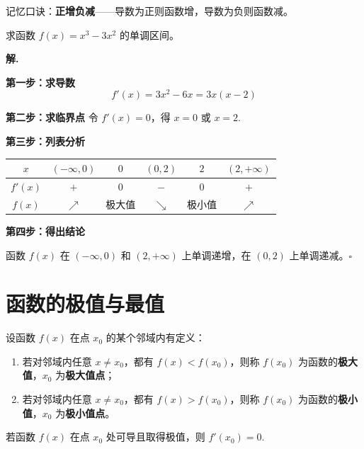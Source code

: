 \begin{note}
记忆口诀：\textbf{正增负减}——导数为正则函数增，导数为负则函数减。
\end{note}

\begin{longexample}
求函数 $f(x) = x^3 - 3x^2$ 的单调区间。
\end{longexample}

\textbf{解.} 

\textbf{第一步：求导数}
\[ f'(x) = 3x^2 - 6x = 3x(x - 2) \]

\textbf{第二步：求临界点}
令 $f'(x) = 0$，得 $x = 0$ 或 $x = 2$.

\textbf{第三步：列表分析}

\begin{center}
\begin{tabular}{c|ccccc}
\toprule
$x$ & $(-\infty, 0)$ & $0$ & $(0, 2)$ & $2$ & $(2, +\infty)$ \\
\midrule
$f'(x)$ & $+$ & $0$ & $-$ & $0$ & $+$ \\
$f(x)$ & $\nearrow$ & 极大值 & $\searrow$ & 极小值 & $\nearrow$ \\
\bottomrule
\end{tabular}
\end{center}

\textbf{第四步：得出结论}

函数 $f(x)$ 在 $(-\infty, 0)$ 和 $(2, +\infty)$ 上单调递增，在 $(0, 2)$ 上单调递减。\hfill $\square$

\section{函数的极值与最值}

\begin{definition}[极值]
设函数 $f(x)$ 在点 $x_0$ 的某个邻域内有定义：
\begin{enumerate}
    \item 若对邻域内任意 $x \neq x_0$，都有 $f(x) < f(x_0)$，则称 $f(x_0)$ 为函数的\textbf{极大值}，$x_0$ 为\textbf{极大值点}；
    \item 若对邻域内任意 $x \neq x_0$，都有 $f(x) > f(x_0)$，则称 $f(x_0)$ 为函数的\textbf{极小值}，$x_0$ 为\textbf{极小值点}。
\end{enumerate}
\end{definition}

\begin{theorem}[极值的必要条件]
若函数 $f(x)$ 在点 $x_0$ 处可导且取得极值，则 $f'(x_0) = 0$.
\end{theorem}

